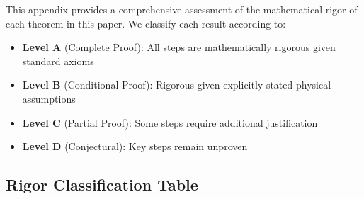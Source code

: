 \documentclass[12pt,a4paper]{article}
\begin{document}
This appendix provides a comprehensive assessment of the mathematical rigor of each theorem in this paper. We classify each result according to:
\begin{itemize}
    \item \textbf{Level A} (Complete Proof): All steps are mathematically rigorous given standard axioms
    \item \textbf{Level B} (Conditional Proof): Rigorous given explicitly stated physical assumptions
    \item \textbf{Level C} (Partial Proof): Some steps require additional justification
    \item \textbf{Level D} (Conjectural): Key steps remain unproven
\end{itemize}

\subsection{Rigor Classification Table}
\end{document}
